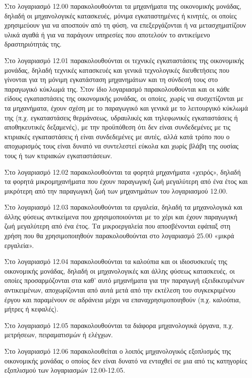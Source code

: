 \documentclass[A4,10pt,greek]{book}
\begin{document}
Στο λογαριασμό 12.00 παρακολουθούνται τα μηχανήματα της οικονομικής μονάδας, δηλαδή οι μηχανολογικές κατασκευές, μόνιμα εγκαταστημένες ή κινητές, οι οποίες χρησιμεύουν για να αποσπούν από τη φύση, να επεξεργάζονται ή να μετασχηματίζουν υλικά αγαθά ή για να παράγουν υπηρεσίες που αποτελούν το αντικείμενο δραστηριότητάς της.

Στο λογαριασμό 12.01 παρακολουθούνται οι τεχνικές εγκαταστάσεις της οικονομικής μονάδας, δηλαδή τεχνικές κατασκευές και γενικά τεχνολογικές διευθετήσεις που γίνονται για τη μόνιμη εγκατάσταση μηχανημάτων και τη σύνδεσή τους στο παραγωγικό κύκλωμά της. Στον ίδιο λογαριασμό παρακολουθούνται και οι κάθε είδους εγκαταστάσεις της οικονομικής μονάδας, οι οποίες, χωρίς να συσχετίζονται με τα μηχανήματα, έχουν σχέση με το παραγωγικό και γενικά με το λειτουργικό κύκλωμά της (π.χ. εγκαταστάσεις θερμάνσεως, υδραυλικές και τηλεφωνικές εγκαταστάσεις ή αποθηκευτικές δεξαμενές), με την προϋπόθεση ότι δεν είναι συνδεδεμένες με τις κτιριακές εγκαταστάσεις ή είναι συνδεδεμένες με αυτές, αλλά κατά τρόπο που ο αποχωρισμός τους είναι δυνατό να συντελεστεί εύκολα και χωρίς βλάβη της ουσίας τους ή των κτιριακών εγκαταστάσεων.

Στο λογαριασμό 12.02 παρακολουθούνται τα φορητά μηχανήματα «χειρός», δηλαδή τα φορητά μικρομηχανήματα που έχουν παραγωγική ζωή μεγαλύτερη από ένα έτος και μικρότερη από την παραγωγική ζωή των μηχανημάτων του λογαριασμού 12.00.

Στο λογαριασμό 12.03 παρακολουθούνται τα εργαλεία, δηλαδή τα μηχανολογικά και άλλης φύσεως αντικείμενα που χρησιμοποιούνται με το χέρι και έχουν παραγωγική ζωή μεγαλύτερη από ένα έτος. Τα μικροεργαλεία που αποσβένονται εφάπαξ στη χρήση που θα χρησιμοποιηθούν παρακολουθούνται στο λογαριασμό 25.00 «μικρά εργαλεία».

Στο λογαριασμό 12.04 παρακολουθούνται τα καλούπια και οι ιδιοσυσκευές της οικονομικής μονάδας, δηλαδή οι μηχανολογικές και άλλης φύσεως κατασκευές, οι οποίες προσαρμόζονται στα καθ' αυτό μηχανήματα για την παραγωγή εξειδικευμένων αντικειμένων, αποχωρίζονται από αυτά μετά από την εκτέλεση του συγκεκριμένου έργου και παραμένουν σε αδράνεια μέχρι να επαναχρησιμοποιηθούν (π.χ. καλούπια, μήτρες ή κεφαλές).

Στο λογαριασμό 12.05 παρακολουθούνται τα διάφορα μηχανολογικά όργανα, π.χ.  μετρήσεων, πειραματισμών ή ελέγχων.

Στο λογαριασμό 12.06 παρακολουθείται ο λοιπός μηχανολογικός εξοπλισμός της οικονομικής μονάδας ο οποίος δεν είναι δυνατό να ενταχθεί σε μια από τις κατηγορίες εξοπλισμού των λογαριασμών 12.00-12.05.
\end{document}
